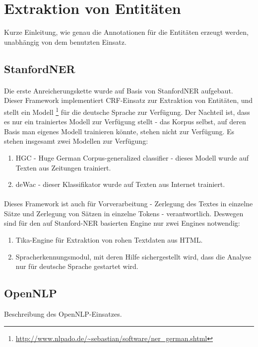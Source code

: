 \section{Extraktion von Entitäten}
Kurze Einleitung, wie genau die Annotationen für die Entitäten erzeugt werden, unabhängig von dem benutzten Einsatz.

\subsection{StanfordNER} 
\paragraph{}
Die erste Anreicherungskette wurde auf Basis von StanfordNER aufgebaut. Dieser Framework implementiert CRF-Einsatz zur Extraktion von Entitäten, und stellt ein Modell \footnote{\url{http://www.nlpado.de/~sebastian/software/ner_german.shtml}} für die deutsche Sprache zur Verfügung. Der Nachteil ist, dass es nur ein trainiertes Modell zur Verfügung stellt - das Korpus selbst, auf deren Basis man eigenes Modell trainieren könnte, stehen nicht zur Verfügung. Es stehen insgesamt zwei Modellen zur Verfügung:

\begin{enumerate}
\item HGC - Huge German Corpus-generalized classifier - dieses Modell wurde auf Texten aus Zeitungen trainiert.
\item deWac - dieser Klassifikator wurde auf Texten aus Internet trainiert.
\end{enumerate}

\paragraph{}
Dieses Framework ist auch für Vorverarbeitung - Zerlegung des Textes in einzelne Sätze und Zerlegung von Sätzen in einzelne Tokens - verantwortlich. Deswegen sind für den auf Stanford-NER basierten Engine nur zwei Engines notwendig:
\begin{enumerate}
\item Tika-Engine für Extraktion von rohen Textdaten aus HTML.
\item Spracherkennungsmodul, mit deren Hilfe sichergestellt wird, dass die Analyse nur für deutsche Sprache gestartet wird.
\end{enumerate}

\subsection{OpenNLP}
Beschreibung des OpenNLP-Einsatzes.

